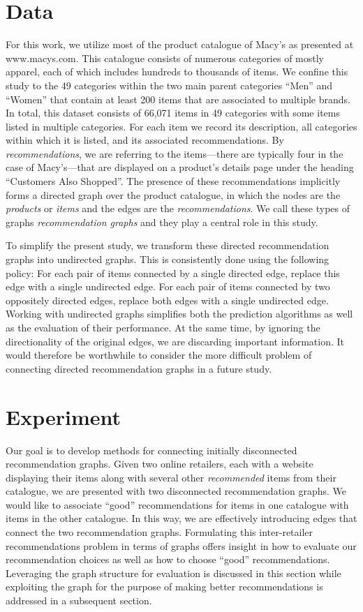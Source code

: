 \documentclass[11pt]{article}
\begin{document}
\section*{Data}
For this work, we utilize most of the product catalogue of Macy's as presented
at www.macys.com. This catalogue consists of numerous categories of mostly
apparel, each of which includes hundreds to thousands of items. We confine this
study to the 49 categories within the two main parent categories ``Men'' and
``Women'' that contain at least 200 items that are associated to multiple
brands. In total, this dataset consists of 66,071 items in 49 categories with
some items listed in multiple categories. For each item we record its
description, all categories within which it is listed, and its associated
recommendations. By {\em recommendations}, we are referring to the items---there
are typically four in the case of Macy's---that are displayed on a product's
details page under the heading ``Customers Also Shopped''. The presence of these
recommendations implicitly forms a directed graph over the product catalogue, in
which the nodes are the {\em products} or {\em items} and the edges are the {\em
recommendations}. We call these types of graphs {\em recommendation graphs} and
they play a central role in this study.

To simplify the present study, we transform these directed recommendation graphs
into undirected graphs. This is consistently done using the following policy:
For each pair of items connected by a single directed edge, replace this edge
with a single undirected edge. For each pair of items connected by two
oppositely directed edges, replace both edges with a single undirected edge.
Working with undirected graphs simplifies both the prediction algorithms as well
as the evaluation of their performance. At the same time, by ignoring the
directionality of the original edges, we are discarding important information.
It would therefore be worthwhile to consider the more difficult problem of
connecting directed recommendation graphs in a future study.

\section*{Experiment}
Our goal is to develop methods for connecting initially disconnected
recommendation graphs. Given two online retailers, each with a website
displaying their items along with several other {\em recommended} items from
their catalogue, we are presented with two disconnected recommendation graphs.
We would like to associate ``good'' recommendations for items in one catalogue
with items in the other catalogue. In this way, we are effectively introducing
edges that connect the two recommendation graphs. Formulating this
inter-retailer recommendations problem in terms of graphs offers insight in how
to evaluate our recommendation choices as well as how to choose ``good''
recommendations.  Leveraging the graph structure for evaluation is discussed in
this section while exploiting the graph for the purpose of making better
recommendations is addressed in a subsequent section.
\end{document}
